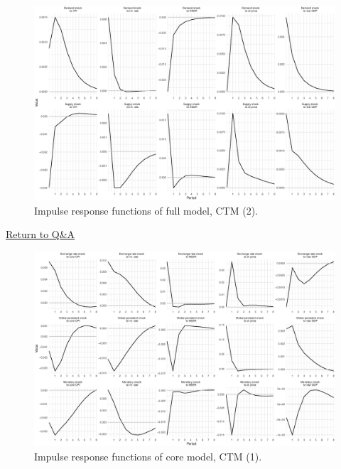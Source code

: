 \documentclass{beamer}
\begin{document}
\begin{frame}[noframenumbering]
	\begin{figure}[h!]
		\centering
		\includegraphics[width=1\linewidth]{../Text/figures/irf_2}
		\caption[]{Impulse response functions of full model, CTM (2).}
		\label{fig:irf_2}
	\end{figure}
\hyperref[qa]{Return to Q\&A}
\end{frame}

\begin{frame}[noframenumbering]
	\label{coreirfs}
	\begin{figure}[h!]
		\centering
		\includegraphics[width=1\linewidth]{../Text/figures/irf_core_1}
		\caption[]{Impulse response functions of core model, CTM (1).}
		\label{fig:irf_core_1}
	\end{figure}
\end{frame}
\end{document}
